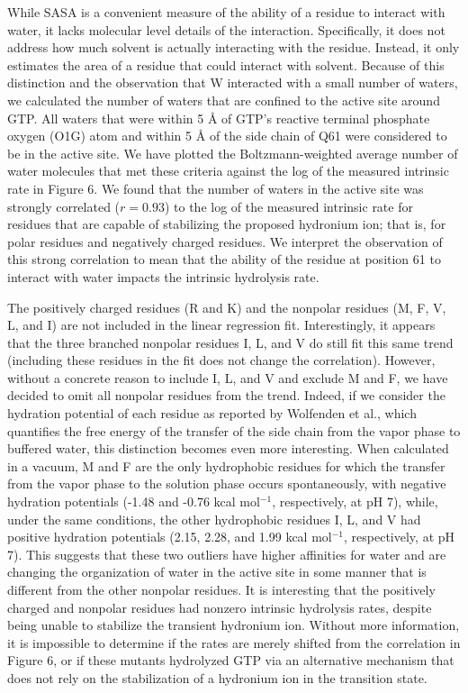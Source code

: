 While SASA is a convenient measure of the ability of a residue to interact with water, it lacks molecular level details of the interaction. 
Specifically, it does not address how much solvent is actually interacting with the residue. 
Instead, it only estimates the area of a residue that could interact with solvent. 
Because of this distinction and the observation that W interacted with a small number of waters, we calculated the number of waters that are confined to the active site around GTP. 
All waters that were within 5 \si{\angstrom} of GTP's reactive terminal phosphate oxygen (O1G) atom and within 5 \si{\angstrom} of the side chain of Q61 were considered to be in the active site. 
We have plotted the Boltzmann-weighted average number of water molecules that met these criteria against the log of the measured intrinsic rate in Figure 6. 
We found that the number of waters in the active site was strongly correlated ($r = 0.93$) to the log of the measured intrinsic rate for residues that are capable of stabilizing the proposed hydronium ion; that is, for polar residues and negatively charged residues. 
We interpret the observation of this strong correlation to mean that the ability of the residue at position 61 to interact with water impacts the intrinsic hydrolysis rate.

The positively charged residues (R and K) and the nonpolar residues (M, F, V, L, and I) are not included in the linear regression fit. 
Interestingly, it appears that the three branched nonpolar residues I, L, and V do still fit this same trend (including these residues in the fit does not change the correlation). 
However, without a concrete reason to include I, L, and V and exclude M and F, we have decided to omit all nonpolar residues from the trend. 
Indeed, if we consider the hydration potential of each residue as reported by Wolfenden et al.\cite{Wolfenden1981}, which quantifies the free energy of the transfer of the side chain from the vapor phase to buffered water, this distinction becomes even more interesting. 
When calculated in a vacuum, M and F are the only hydrophobic residues for which the transfer from the vapor phase to the solution phase occurs spontaneously, with negative hydration potentials (-1.48 and -0.76 kcal mol$^{-1}$, respectively, at pH 7), while, under the same conditions, the other hydrophobic residues I, L, and V had positive hydration potentials (2.15, 2.28, and 1.99 kcal mol$^{-1}$, respectively, at pH 7). 
This suggests that these two outliers have higher affinities for water and are changing the organization of water in the active site in some manner that is different from the other nonpolar residues. 
It is interesting that the positively charged and nonpolar residues had nonzero intrinsic hydrolysis rates, despite being unable to stabilize the transient hydronium ion. 
Without more information, it is impossible to determine if the rates are merely shifted from the correlation in Figure 6, or if these mutants hydrolyzed GTP via an alternative mechanism that does not rely on the stabilization of a hydronium ion in the transition state.

